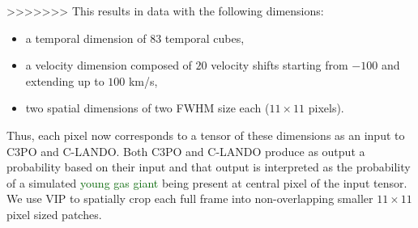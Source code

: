\documentclass{aa}
\newcommand{\newchange}[1]{\textcolor{darkgreen}{#1}}
\begin{document}
{{{>>>>>>>
This results in data with the following dimensions:
\begin{itemize}
    \item a temporal dimension of $83$ temporal cubes, 
    \item a velocity dimension composed of $20$ velocity shifts starting from $-100$ and extending up to $100$ km/s, 
    \item two spatial dimensions of two FWHM size each ($11\times 11$ pixels).
\end{itemize}
Thus, each pixel now corresponds to a tensor of these dimensions as an input to C3PO and C-LANDO.
Both C3PO and C-LANDO produce as output a probability based on their input and that output is interpreted as the probability of a simulated \newchange{young gas giant} being present at central pixel of the input tensor.
We use VIP to spatially crop each full frame into non-overlapping smaller $11\times11$ pixel sized patches.

}}}
\end{document}
